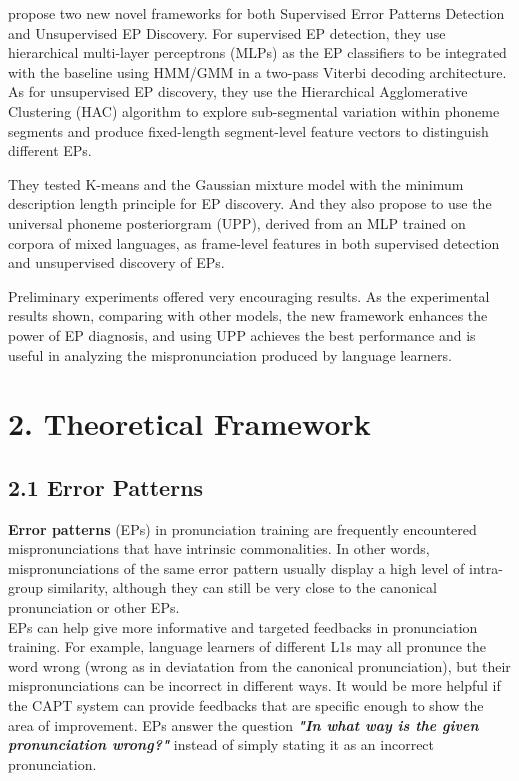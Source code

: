 \documentclass[nobib]{tufte-handout}
\begin{document}
\cite{wang2015supervised} propose two new novel frameworks for both Supervised Error Patterns Detection and Unsupervised EP Discovery.  For supervised EP detection,  they use hierarchical multi-layer perceptrons (MLPs) as the EP classifiers to be integrated with the baseline using HMM/GMM in a two-pass Viterbi decoding architecture.  As for unsupervised EP discovery, they  use the Hierarchical Agglomerative Clustering (HAC) algorithm to explore sub-segmental variation within phoneme segments and produce fixed-length segment-level feature vectors to distinguish different EPs. 

They tested K-means  and the Gaussian mixture model with the minimum description length principle  for EP discovery.  And they also propose to use the universal phoneme posteriorgram (UPP), derived from an MLP trained on corpora of mixed languages, as frame-level features in both supervised detection and unsupervised discovery of EPs. 

Preliminary experiments offered very encouraging results.  As the experimental results shown, comparing with other models, the new framework enhances the power of EP diagnosis, and using UPP achieves the best performance and is useful in analyzing the mispronunciation produced by language learners.





\bigskip
\section{2. \textbf{Theoretical Framework}}
\subsection{2.1 \textbf{Error Patterns}}

\textbf{Error patterns} (EPs) in pronunciation training are frequently encountered mispronunciations that have intrinsic commonalities. In other words, mispronunciations of the same error pattern usually display a high level of intra-group similarity, although they can still be very close to the canonical pronunciation or other EPs.\\

EPs can help give more informative and targeted feedbacks in pronunciation training. For example, language learners of different L1s may all pronunce the word wrong (wrong as in deviatation from the canonical pronunciation), but their mispronunciations can be incorrect in different ways. It would be more helpful if the CAPT system can provide feedbacks that are specific enough to show the area of improvement. EPs answer the question \textbf{\textit{"In what way is the given pronunciation wrong?"}} instead of simply stating it as an incorrect pronunciation.\\
\end{document}
